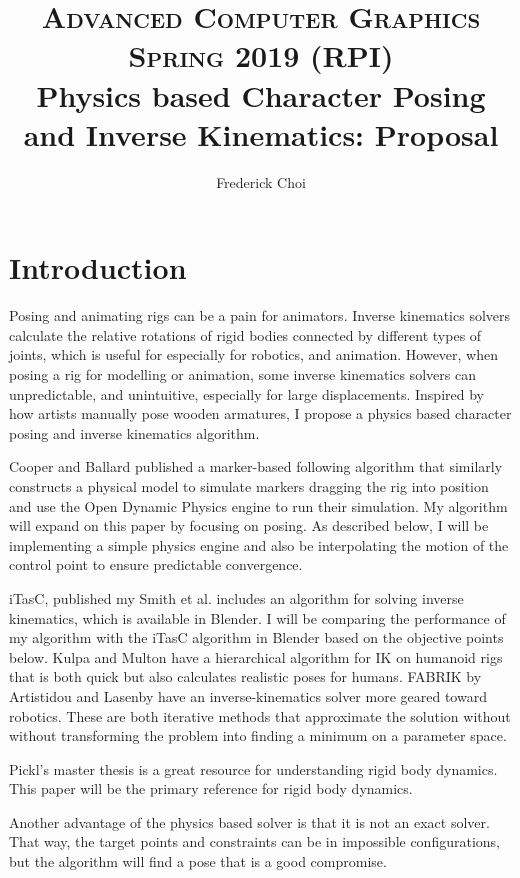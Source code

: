 \documentclass[10pt,twocolumn,letterpaper]{article}
\title{
		\usefont{OT1}{bch}{b}{n}
		\normalfont \normalsize \textsc{Advanced Computer Graphics Spring 2019 (RPI)} \\ [10pt]
		\huge Physics based Character Posing and Inverse Kinematics: Proposal \\
}
\author[0]{Frederick Choi}
\begin{document}
\maketitle


\section*{Introduction}
Posing and animating rigs can be a pain for animators. Inverse kinematics solvers calculate the relative rotations of rigid bodies connected by different types of joints, which is useful for especially for robotics, and animation. However, when posing a rig for modelling or animation, some inverse kinematics solvers can unpredictable, and unintuitive, especially for large displacements. Inspired by how artists manually pose wooden armatures, I propose a physics based character posing and inverse kinematics algorithm.

Cooper and Ballard \cite{Co} published a marker-based following algorithm that similarly constructs a physical model to simulate markers dragging the rig into position and use the Open Dynamic Physics engine to run their simulation. My algorithm will expand on this paper by focusing on posing. As described below, I will be implementing a simple physics engine and also be interpolating the motion of the control point to ensure predictable convergence.

iTasC, published my Smith et al. \cite{Sm} includes an algorithm for solving inverse kinematics, which is available in Blender. I will be comparing the performance of my algorithm with the iTasC algorithm in Blender based on the objective points below. Kulpa and Multon \cite{Ku} have a hierarchical algorithm for IK on humanoid rigs that is both quick but also calculates realistic poses for humans. FABRIK by Artistidou and Lasenby \cite{Ar} have an inverse-kinematics solver more geared toward robotics. These are both iterative methods that approximate the solution without without transforming the problem into finding a minimum on a parameter space. 

Pickl's master thesis \cite{Pi} is a great resource for understanding rigid body dynamics. This paper will be the primary reference for rigid body dynamics.

Another advantage of the physics based solver is that it is not an exact solver. That way, the target points and constraints can be in impossible configurations, but the algorithm will find a pose that is a good compromise.
\end{document}

